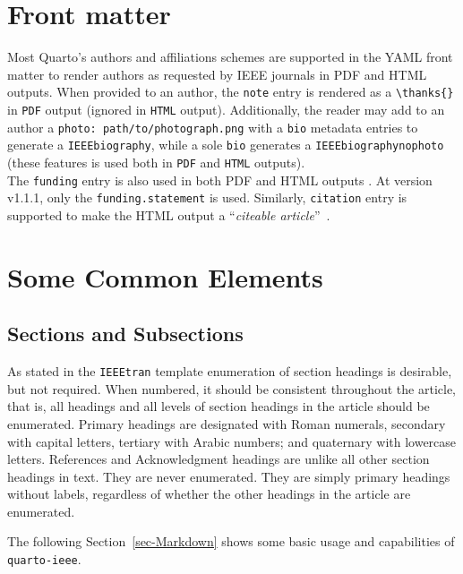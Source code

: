 \documentclass[
  twoside,
  web,
            journal,
    ]{ieeecolor}
\theoremstyle{plain}
\theoremstyle{remark}
\begin{document}
\section{Front matter}\label{front-matter}

Most Quarto's authors and affiliations schemes
 are supported in the YAML front
matter to render authors as requested by IEEE journals in PDF and HTML
outputs. When provided to an author, the \texttt{note} entry is rendered
as a \texttt{\textbackslash{}thanks\{\}} in \texttt{PDF} output (ignored
in \texttt{HTML} output). Additionally, the reader may add to an author
a \texttt{photo:\ path/to/photograph.png} with a \texttt{bio} metadata
entries to generate a \texttt{IEEEbiography}, while a sole \texttt{bio}
generates a \texttt{IEEEbiographynophoto} (these features is used both
in \texttt{PDF} and \texttt{HTML} outputs).\\
The \texttt{funding} entry is also used in both PDF and HTML outputs
. At version v1.1.1, only the
\texttt{funding.statement} is used. Similarly, \texttt{citation} entry
is supported to make the HTML output a ``\emph{citeable
article}''~.

\section{Some Common Elements}\label{some-common-elements}

\subsection{Sections and Subsections}\label{sections-and-subsections}

As stated in the \texttt{IEEEtran} template enumeration of section
headings is desirable, but not required. When numbered, it should be
consistent throughout the article, that is, all headings and all levels
of section headings in the article should be enumerated. Primary
headings are designated with Roman numerals, secondary with capital
letters, tertiary with Arabic numbers; and quaternary with lowercase
letters. References and Acknowledgment headings are unlike all other
section headings in text. They are never enumerated. They are simply
primary headings without labels, regardless of whether the other
headings in the article are enumerated.

The following Section~\ref{sec-Markdown} shows some basic usage and
capabilities of \texttt{quarto-ieee}.
\end{document}

